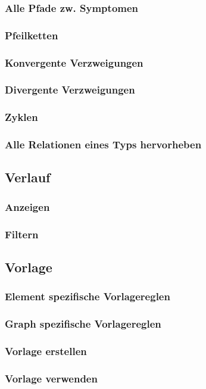 \documentclass[enabledeprecatedfontcommands,fontsize=11pt,paper=a4,twoside]{scrartcl}
\newcounter{one}
\begin{document}
		\subsubsection{Alle Pfade zw. Symptomen}
		\subsubsection{Pfeilketten}
		\subsubsection{Konvergente Verzweigungen}
		\subsubsection{Divergente Verzweigungen}
		\subsubsection{Zyklen}
		\subsubsection{Alle Relationen eines Typs hervorheben}		
	\subsection{Verlauf} \label{logs}
		\subsubsection{Anzeigen}
		\subsubsection{Filtern}
	\subsection{Vorlage} \label{template}
		\subsubsection{Element spezifische Vorlagereglen}
		\subsubsection{Graph spezifische Vorlagereglen}
		\subsubsection{Vorlage erstellen}
		\subsubsection{Vorlage verwenden}
\end{document}
